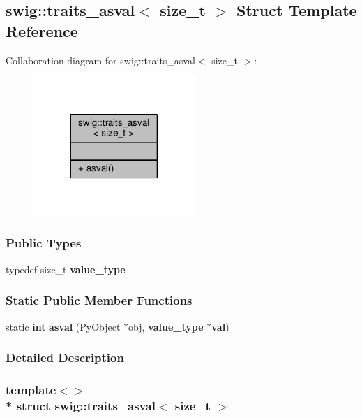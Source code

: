 \subsection{swig\+:\+:traits\+\_\+asval$<$ size\+\_\+t $>$ Struct Template Reference}
\label{structswig_1_1traits__asval_3_01size__t_01_4}


Collaboration diagram for swig\+:\+:traits\+\_\+asval$<$ size\+\_\+t $>$\+:
\nopagebreak
\begin{figure}[H]
\begin{center}
\leavevmode
\includegraphics[width=173pt]{d1/d52/structswig_1_1traits__asval_3_01size__t_01_4__coll__graph}
\end{center}
\end{figure}
\subsubsection*{Public Types}
\begin{DoxyCompactItemize}
\item 
typedef size\+\_\+t {\bf value\+\_\+type}
\end{DoxyCompactItemize}
\subsubsection*{Static Public Member Functions}
\begin{DoxyCompactItemize}
\item 
static {\bf int} {\bf asval} (Py\+Object $\ast$obj, {\bf value\+\_\+type} $\ast${\bf val})
\end{DoxyCompactItemize}


\subsubsection{Detailed Description}
\subsubsection*{template$<$$>$\\*
struct swig\+::traits\+\_\+asval$<$ size\+\_\+t $>$}



